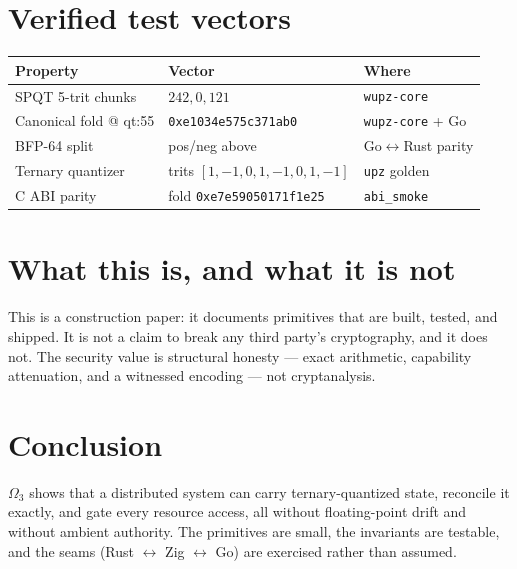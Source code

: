 \documentclass[11pt]{article}
\begin{document}
\section{Verified test vectors}
\begin{center}
\begin{tabular}{@{}lll@{}}
\toprule
Property & Vector & Where \\
\midrule
SPQT 5-trit chunks & $242,0,121$ & \texttt{wupz-core} \\
Canonical fold @ qt:55 & \texttt{0xe1034e575c371ab0} & \texttt{wupz-core} + Go \\
BFP-64 split & pos/neg above & Go$\leftrightarrow$Rust parity \\
Ternary quantizer & trits $[1,-1,0,1,-1,0,1,-1]$ & \texttt{upz} golden \\
C ABI parity & fold \texttt{0xe7e59050171f1e25} & \texttt{abi\_smoke} \\
\bottomrule
\end{tabular}
\end{center}

\section{What this is, and what it is not}
This is a construction paper: it documents primitives that are built, tested, and
shipped. It is not a claim to break any third party's cryptography, and it does
not. The security value is structural honesty --- exact arithmetic, capability
attenuation, and a witnessed encoding --- not cryptanalysis.

\section{Conclusion}
$\Omega_3$ shows that a distributed system can carry ternary-quantized state,
reconcile it exactly, and gate every resource access, all without floating-point
drift and without ambient authority. The primitives are small, the invariants are
testable, and the seams (Rust $\leftrightarrow$ Zig $\leftrightarrow$ Go) are
exercised rather than assumed.
\end{document}
